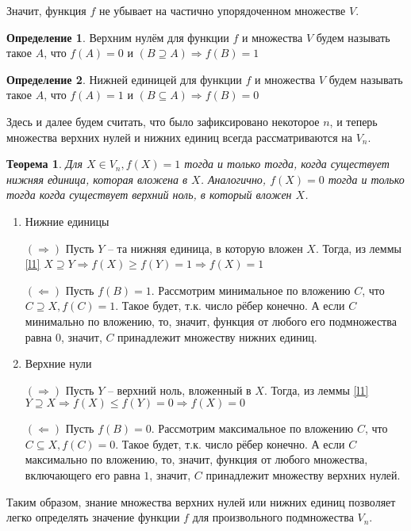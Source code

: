 \documentclass[a4paper]{article}
\newtheorem{theorem}{Теорема}[section]
\theoremstyle{definition}
\newtheorem{definition}{Определение}[section]
\begin{document}
Значит, функция $f$ не убывает на частично упорядоченном множестве $V$.

\begin{definition}
	Верхним нулём для функции $f$ и множества $V$ будем называть такое $A$, что $f(A) = 0$ и $(B \supseteq A ) \Rightarrow f(B) = 1$
\end{definition}
\begin{definition}
	Нижней единицей для функции $f$ и множества $V$ будем называть такое $A$, что $f(A) = 1$ и $(B \subseteq A ) \Rightarrow f(B) = 0$
\end{definition}

Здесь и далее будем считать, что было зафиксировано некоторое $n$, и теперь множества верхних нулей и нижних единиц всегда рассматриваются на $V_n$.

\begin{theorem}
	Для $X \in V_n, f(X) = 1$ тогда и только тогда, когда существует нижняя единица, которая вложена в $X$. Аналогично, $f(X) = 0$ тогда и только тогда когда существует верхний ноль, в который вложен $X$.
\end{theorem}
\begin{enumerate}
	\item Нижние единицы
	
	$(\Rightarrow)$ Пусть $Y$ -- та нижняя единица, в которую вложен $X$. Тогда, из леммы \ref{l1} $X \supseteq Y \Rightarrow f(X) \ge f(Y) = 1 \Rightarrow f(X) = 1$
	
	$(\Leftarrow)$ Пусть $f(B) = 1$. Рассмотрим минимальное по вложению $C$, что $C \supseteq X, f(C) = 1$. Такое будет, т.к. число рёбер конечно. А если $C$ минимально по вложению, то, значит, функция от любого его подмножества равна $0$, значит, $C$ принадлежит множеству нижних единиц.
	
	\item Верхние нули
	
	$(\Rightarrow)$ Пусть $Y$ -- верхний ноль, вложенный в $X$. Тогда, из леммы \ref{l1} $Y \supseteq X \Rightarrow f(X) \le f(Y) = 0 \Rightarrow f(X) = 0$
	
	$(\Leftarrow)$ Пусть $f(B) = 0$. Рассмотрим максимальное по вложению $C$, что $C \subseteq X, f(C) = 0$. Такое будет, т.к. число рёбер конечно. А если $C$ максимально по вложению, то, значит, функция от любого множества, включающего его равна $1$, значит, $C$ принадлежит множеству верхних нулей.
\end{enumerate}

Таким образом, знание множества верхних нулей или нижних единиц позволяет легко определять значение функции $f$ для произвольного подмножества $V_n$.
\end{document}
